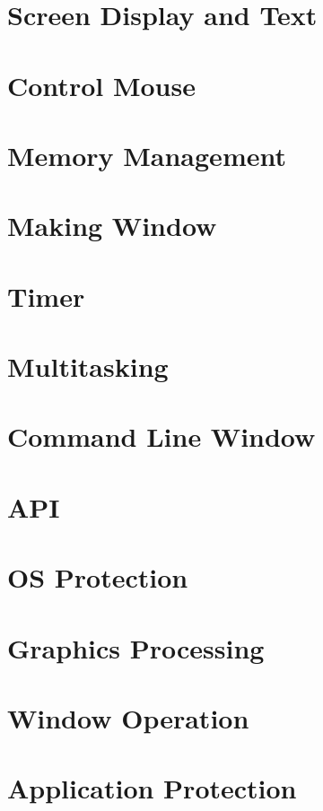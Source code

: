 \documentclass{swfcthesisp}
\begin{document}
\section{Screen Display and Text}

\section{Control Mouse}


\section{Memory Management}

\section{Making Window }

\section{Timer}

\section{Multitasking}

\section{Command Line Window}

\section{API}

\section{OS Protection}

\section{Graphics Processing}

\section{Window Operation}

\section{Application Protection}
\end{document}
